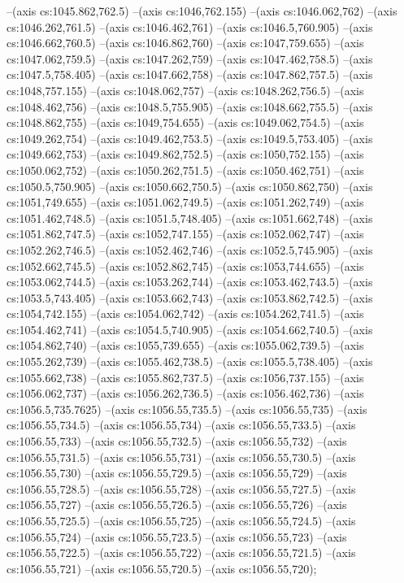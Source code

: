--(axis cs:1045.862,762.5)
--(axis cs:1046,762.155)
--(axis cs:1046.062,762)
--(axis cs:1046.262,761.5)
--(axis cs:1046.462,761)
--(axis cs:1046.5,760.905)
--(axis cs:1046.662,760.5)
--(axis cs:1046.862,760)
--(axis cs:1047,759.655)
--(axis cs:1047.062,759.5)
--(axis cs:1047.262,759)
--(axis cs:1047.462,758.5)
--(axis cs:1047.5,758.405)
--(axis cs:1047.662,758)
--(axis cs:1047.862,757.5)
--(axis cs:1048,757.155)
--(axis cs:1048.062,757)
--(axis cs:1048.262,756.5)
--(axis cs:1048.462,756)
--(axis cs:1048.5,755.905)
--(axis cs:1048.662,755.5)
--(axis cs:1048.862,755)
--(axis cs:1049,754.655)
--(axis cs:1049.062,754.5)
--(axis cs:1049.262,754)
--(axis cs:1049.462,753.5)
--(axis cs:1049.5,753.405)
--(axis cs:1049.662,753)
--(axis cs:1049.862,752.5)
--(axis cs:1050,752.155)
--(axis cs:1050.062,752)
--(axis cs:1050.262,751.5)
--(axis cs:1050.462,751)
--(axis cs:1050.5,750.905)
--(axis cs:1050.662,750.5)
--(axis cs:1050.862,750)
--(axis cs:1051,749.655)
--(axis cs:1051.062,749.5)
--(axis cs:1051.262,749)
--(axis cs:1051.462,748.5)
--(axis cs:1051.5,748.405)
--(axis cs:1051.662,748)
--(axis cs:1051.862,747.5)
--(axis cs:1052,747.155)
--(axis cs:1052.062,747)
--(axis cs:1052.262,746.5)
--(axis cs:1052.462,746)
--(axis cs:1052.5,745.905)
--(axis cs:1052.662,745.5)
--(axis cs:1052.862,745)
--(axis cs:1053,744.655)
--(axis cs:1053.062,744.5)
--(axis cs:1053.262,744)
--(axis cs:1053.462,743.5)
--(axis cs:1053.5,743.405)
--(axis cs:1053.662,743)
--(axis cs:1053.862,742.5)
--(axis cs:1054,742.155)
--(axis cs:1054.062,742)
--(axis cs:1054.262,741.5)
--(axis cs:1054.462,741)
--(axis cs:1054.5,740.905)
--(axis cs:1054.662,740.5)
--(axis cs:1054.862,740)
--(axis cs:1055,739.655)
--(axis cs:1055.062,739.5)
--(axis cs:1055.262,739)
--(axis cs:1055.462,738.5)
--(axis cs:1055.5,738.405)
--(axis cs:1055.662,738)
--(axis cs:1055.862,737.5)
--(axis cs:1056,737.155)
--(axis cs:1056.062,737)
--(axis cs:1056.262,736.5)
--(axis cs:1056.462,736)
--(axis cs:1056.5,735.7625)
--(axis cs:1056.55,735.5)
--(axis cs:1056.55,735)
--(axis cs:1056.55,734.5)
--(axis cs:1056.55,734)
--(axis cs:1056.55,733.5)
--(axis cs:1056.55,733)
--(axis cs:1056.55,732.5)
--(axis cs:1056.55,732)
--(axis cs:1056.55,731.5)
--(axis cs:1056.55,731)
--(axis cs:1056.55,730.5)
--(axis cs:1056.55,730)
--(axis cs:1056.55,729.5)
--(axis cs:1056.55,729)
--(axis cs:1056.55,728.5)
--(axis cs:1056.55,728)
--(axis cs:1056.55,727.5)
--(axis cs:1056.55,727)
--(axis cs:1056.55,726.5)
--(axis cs:1056.55,726)
--(axis cs:1056.55,725.5)
--(axis cs:1056.55,725)
--(axis cs:1056.55,724.5)
--(axis cs:1056.55,724)
--(axis cs:1056.55,723.5)
--(axis cs:1056.55,723)
--(axis cs:1056.55,722.5)
--(axis cs:1056.55,722)
--(axis cs:1056.55,721.5)
--(axis cs:1056.55,721)
--(axis cs:1056.55,720.5)
--(axis cs:1056.55,720);

